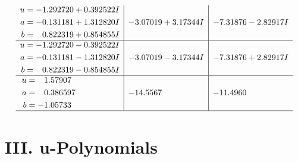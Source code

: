 \documentclass[1p]{elsarticle_modified}
\theoremstyle{definition}
\begin{document}
$$\begin{array}{c|c|c}
\begin{aligned}
u &= -1.292720 + 0.392522 I \\
a &= -0.131181 + 1.312820 I \\
b &= \phantom{-}0.822319 + 0.854855 I\end{aligned}
 & -3.07019 + 3.17344 I & -7.31876 - 2.82917 I \\ \hline\begin{aligned}
u &= -1.292720 - 0.392522 I \\
a &= -0.131181 - 1.312820 I \\
b &= \phantom{-}0.822319 - 0.854855 I\end{aligned}
 & -3.07019 - 3.17344 I & -7.31876 + 2.82917 I \\ \hline\begin{aligned}
u &= \phantom{-}1.57907\phantom{ +0.000000I} \\
a &= \phantom{-}0.386597\phantom{ +0.000000I} \\
b &= -1.05733\phantom{ +0.000000I}\end{aligned}
 & -14.5567\phantom{ +0.000000I} & -11.4960\phantom{ +0.000000I}\\
 \hline 
 \end{array}$$\newpage
\newpage\renewcommand{\arraystretch}{1}
\centering \section*{ III. u-Polynomials}
\end{document}
